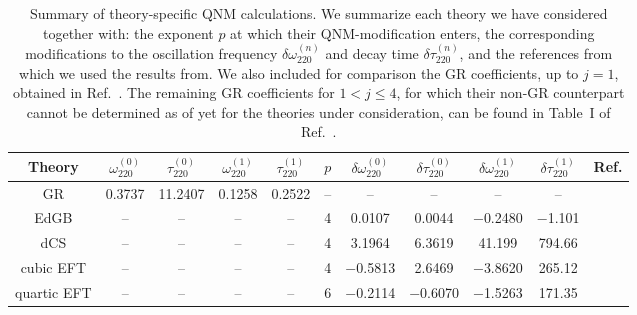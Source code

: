 \documentclass[twocolumn,
               prd,
               aps,
               superscriptaddress,
               tightenlines,
               nofootinbib,
               eqsecnum,
               amsfonts,
               amsmath,
               longbibliography]{revtex4-1}
\begin{document}
\begin{table}[t]
\begin{tabular}{c | c c c c c c c c c c}
\hline
\hline
Theory      & $\omega^{(0)}_{220}$ & $\tau^{(0)}_{220}$ & $\omega^{(1)}_{220}$ & $\tau^{(1)}_{220}$ & $p$ & $\delta \omega^{(0)}_{220}$ & $\delta \tau^{(0)}_{220}$ & $\delta \omega^{(1)}_{220}$ & $\delta \tau^{(1)}_{220}$ & Ref.  \\
\hline
GR          & 0.3737               & 11.2407            &  0.1258              & 0.2522             & --  & --                          & --                        & --                          & --                        & \cite{Maselli:2019mjd} \\
\hline
EdGB        & --                   & --                 &  --                  & --                 & 4   & 0.0107                      & 0.0044                    & $-$0.2480                   & $-$1.101                  & \cite{Pani:2009wy,Blazquez-Salcedo:2016enn,Pierini:2021jxd} \\
dCS         & --                   & --                 &  --                  & --                 & 4   & 3.1964                      & 6.3619                    & 41.199                      & 794.66                    & \cite{Wagle:2021tam}  \\
cubic EFT   & --                   & --                 &  --                  & --                 & 4   & $-$0.5813                   & 2.6469                    & $-$3.8620                   & 265.12                    & \cite{Cano:2021myl} \\
quartic EFT & --                   & --                 &  --                  & --                 & 6   & $-$0.2114                   & $-$0.6070                 & $-$1.5263                   & 171.35                    & \cite{Cano:2021myl}  \\
\hline
\hline
\end{tabular}
\caption{Summary of theory-specific QNM calculations.
%
We summarize each theory we have considered together with: the exponent $p$ at
which their QNM-modification enters, the corresponding modifications to the
oscillation frequency $\delta \omega^{(n)}_{220}$ and decay time $\delta \tau^{(n)}_{220}$, and the
references from which we used the results from.
%
We also included for comparison the GR coefficients, up to $j=1$, obtained in Ref.~\cite{Maselli:2019mjd}.
%
The remaining GR coefficients for $1< j \leqslant 4$, for which their non-GR counterpart cannot be determined as of yet for
the theories under consideration, can be found in Table~I of Ref.~\cite{Maselli:2019mjd}.
}
\label{tab:ref_theories_qnms}
\end{table}
\end{document}
